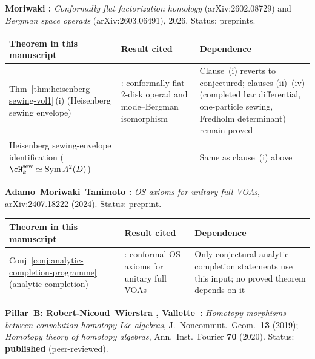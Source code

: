 \begin{remark}
\medskip
\noindent\textbf{Moriwaki \cite{Moriwaki26a, Moriwaki26b}:}
\emph{Conformally flat factorization homology} (arXiv:2602.08729)
and \emph{Bergman space operads} (arXiv:2603.06491), 2026.
Status: preprints.

\smallskip
\renewcommand{\arraystretch}{1.25}
\noindent
\begin{tabular}{p{4.8cm}p{4.2cm}p{5.5cm}}
\textbf{Theorem in this manuscript}
 & \textbf{Result cited}
 & \textbf{Dependence} \\
\hline
Thm~\ref{thm:heisenberg-sewing-vol1}\,(i)
 (Heisenberg sewing envelope)
 & \cite{Moriwaki26b}: conformally flat 2-disk
 operad and mode--Bergman isomorphism
 & Clause~(i) reverts to conjectured; clauses
 (ii)--(iv) (completed bar differential,
 one-particle sewing, Fredholm determinant)
 remain proved \\
Heisenberg sewing-envelope identification
 ($\cH_k^{\mathrm{sew}} \simeq \operatorname{Sym} A^2(D)$)
 & \cite{Moriwaki26b}
 & Same as clause~(i) above
\end{tabular}

\medskip
\noindent\textbf{Adamo--Moriwaki--Tanimoto \cite{AMT24}:}
\emph{OS axioms for unitary full VOAs}, arXiv:2407.18222 (2024).
Status: preprint.

\smallskip
\renewcommand{\arraystretch}{1.25}
\noindent
\begin{tabular}{p{4.8cm}p{4.2cm}p{5.5cm}}
\textbf{Theorem in this manuscript}
 & \textbf{Result cited}
 & \textbf{Dependence} \\
\hline
Conj~\ref{conj:analytic-completion-programme}
 (analytic completion)
 & \cite{AMT24}: conformal OS axioms for unitary
 full VOAs
 & Only conjectural analytic-completion statements use this input;
 no proved theorem depends on it
\end{tabular}

\medskip
\noindent\textbf{Pillar~B: Robert-Nicoud--Wierstra \cite{RNW19},
Vallette~\cite{Val16}:}
\emph{Homotopy morphisms between convolution homotopy Lie algebras},
J.~Noncommut.\ Geom.\ \textbf{13} (2019);
\emph{Homotopy theory of homotopy algebras},
Ann.\ Inst.\ Fourier \textbf{70} (2020).
Status: \textbf{published} (peer-reviewed).


\end{remark}
